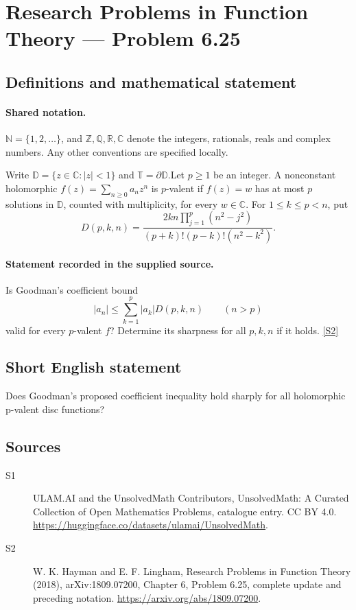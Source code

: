 \documentclass[11pt]{article}
\newcommand{\sref}[2]{\hyperlink{source:#1:#2}{[S#2]}}
\begin{document}
\section{Research Problems in Function Theory — Problem 6.25}\label{statement}

\subsection{Definitions and mathematical statement}

\paragraph{Shared notation.}$\mathbb N=\{1,2,\ldots\}$, and $\mathbb Z,\mathbb Q,\mathbb R,\mathbb C$ denote the integers, rationals, reals and complex numbers. Any other conventions are specified locally.


Write $\mathbb D=\{z\in\mathbb C:|z|<1\}$ and $\mathbb T=\partial\mathbb D$.Let $p\ge1$ be an integer. A nonconstant holomorphic $f(z)=\sum_{n\ge0}a_nz^n$ is $p$-valent if $f(z)=w$ has at most $p$ solutions in $\mathbb D$, counted with multiplicity, for every $w\in\mathbb C$. For $1\le k\le p<n$, put
\[D(p,k,n)=\frac{2kn\prod_{j=1}^p(n^2-j^2)}{(p+k)!(p-k)!(n^2-k^2)}.\]
\paragraph{Statement recorded in the supplied source.}
Is Goodman's coefficient bound
\[|a_n|\le\sum_{k=1}^p|a_k|D(p,k,n)\qquad(n>p)\]
valid for every $p$-valent $f$? Determine its sharpness for all $p,k,n$ if it holds. \sref{statement}{2}
\subsection{Short English statement}
Does Goodman’s proposed coefficient inequality hold sharply for all holomorphic p-valent disc functions?
\subsection{Sources}
\begin{description}
\item[\hypertarget{source:statement:1}{S1}] ULAM.AI and the UnsolvedMath Contributors, UnsolvedMath: A Curated Collection of Open Mathematics Problems, catalogue entry. CC BY 4.0. \url{https://huggingface.co/datasets/ulamai/UnsolvedMath}.
\item[\hypertarget{source:statement:2}{S2}] W. K. Hayman and E. F. Lingham, Research Problems in Function Theory (2018), arXiv:1809.07200, Chapter 6, Problem 6.25, complete update and preceding notation. \url{https://arxiv.org/abs/1809.07200}.
\end{description}
\label{end:statement}
\end{document}
